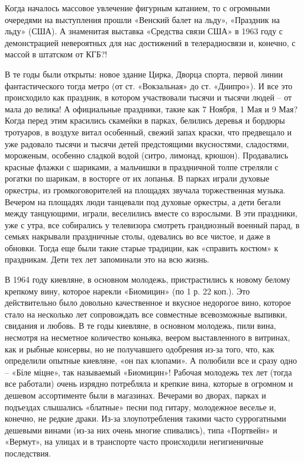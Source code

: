 Когда началось массовое увлечение фигурным катанием, то с огромными очередями
на выступления прошли «Венский балет на льду», «Праздник на льду» (США). А
знаменитая выставка «Средства связи США» в 1963 году с демонстрацией
невероятных для нас достижений в телерадиосвязи и, конечно, с массой в штатском
от КГБ?! 

В те годы были открыты: новое здание Цирка, Дворца спорта, первой линии
фантастического тогда метро (от ст. «Вокзальная» до ст. «Днипро»). И все это
происходило как праздник, в котором участвовали тысячи и тысячи людей – от мала
до велика!  А официальные праздники, такие как 7 Ноября, 1 Мая и 9 Мая? Когда
перед этим красились скамейки в парках, белились деревья и бордюры тротуаров, в
воздухе витал особенный, свежий запах краски, что предвещало и уже радовало
тысячи и тысячи детей предстоящими вкусностями, сладостями, мороженым, особенно
сладкой водой (ситро, лимонад, крюшон). Продавались красные флажки с шариками,
а мальчишки в праздничной толпе стреляли с рогатки по шарикам, в восторге от их
лопанья. В парках играли духовые оркестры, из громкоговорителей на площадях
звучала торжественная музыка. Вечером на площадях люди танцевали под духовые
оркестры, а дети бегали между танцующими, играли, веселились вместе со
взрослыми. В эти праздники, уже с утра, все собирались у телевизора смотреть
грандиозный военный парад, в семьях накрывали праздничные столы, одевались во
все чистое, и даже в обновки. Тогда еще были такие старые традиции, как
«справить костюм» к праздникам. Дети тех лет запоминали это на всю жизнь.

В 1964 году киевляне, в основном молодежь, пристрастились к новому белому
крепкому вину, которое нарекли «Биомицин» (по 1 р. 22 коп.). Это действительно
было довольно качественное и вкусное недорогое вино, которое стало на несколько
лет сопровождать все совместные всевозможные выпивки, свидания и любовь. В те
годы киевляне, в основном молодежь, пили вина, несмотря на несметное количество
коньяка, веером выставленного в витринах, как и рыбные консервы, но не
получавшего одобрения из-за того, что, как определили опытные киевляне, «он пах
клопами». А полюбили все и сразу одно – «Біле міцне», так называемый
«Биомицин»! Рабочая молодежь тех лет (тогда все работали) очень изрядно
потребляла и крепкие вина, которые в огромном и дешевом ассортименте были в
магазинах. Вечерами во дворах, парках и подъездах слышались «блатные» песни под
гитару, молодежное веселье и, конечно, не редкие драки. Из-за злоупотребления
такими часто суррогатными дешевыми винами (из-за них очень многие спивались),
типа «Портвейн» и «Вермут», на улицах и в транспорте часто происходили
негигиеничные последствия. 

